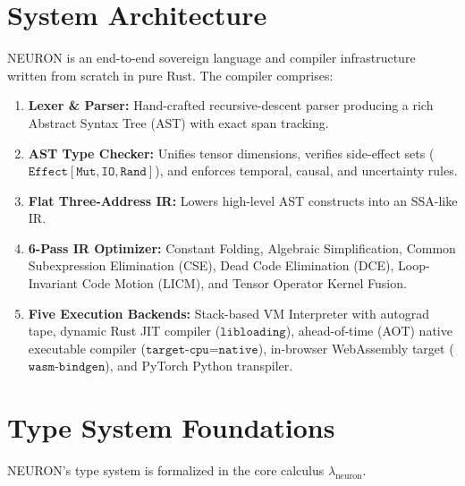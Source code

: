 \documentclass[11pt,twocolumn]{article}
\begin{document}
\section{System Architecture}
NEURON is an end-to-end sovereign language and compiler infrastructure written from scratch in pure Rust.
The compiler comprises:
\begin{enumerate}
  \item \textbf{Lexer \& Parser:} Hand-crafted recursive-descent parser producing a rich Abstract Syntax Tree (AST) with exact span tracking.
  \item \textbf{AST Type Checker:} Unifies tensor dimensions, verifies side-effect sets ($\texttt{Effect}[\texttt{Mut}, \texttt{IO}, \texttt{Rand}]$), and enforces temporal, causal, and uncertainty rules.
  \item \textbf{Flat Three-Address IR:} Lowers high-level AST constructs into an SSA-like IR.
  \item \textbf{6-Pass IR Optimizer:} Constant Folding, Algebraic Simplification, Common Subexpression Elimination (CSE), Dead Code Elimination (DCE), Loop-Invariant Code Motion (LICM), and Tensor Operator Kernel Fusion.
  \item \textbf{Five Execution Backends:} Stack-based VM Interpreter with autograd tape, dynamic Rust JIT compiler ($\texttt{libloading}$), ahead-of-time (AOT) native executable compiler ($\texttt{target-cpu=native}$), in-browser WebAssembly target ($\texttt{wasm-bindgen}$), and PyTorch Python transpiler.
\end{enumerate}

\section{Type System Foundations}
NEURON's type system is formalized in the core calculus $\lambda_{\text{neuron}}$.
\end{document}
